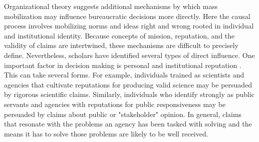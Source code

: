 Organizational theory suggests additional mechanisms by which mass mobilization may influence bureaucratic decisions more directly. Here the causal process involves mobilizing norms and ideas right and wrong rooted in individual and institutional identity. Because concepts of mission, reputation, and the validity of claims are intertwined, these mechanisms are difficult to precisely define. Nevertheless, scholars have identified several types of direct influence. One important factor in decision making is personal and institutional reputation \citep{Carpenter2001}. This can take several forms. For example, individuals trained as scientists and agencies that cultivate reputations for producing valid science may be persuaded by rigorous scientific claims. Similarly, individuals who identify strongly as public servants and agencies with reputations for public responsiveness may be persuaded by claims about public or "stakeholder" opinion. In general, claims that resonate with the problems an agency has been tasked with solving and the means it has to solve those problems are likely to be well received.  






